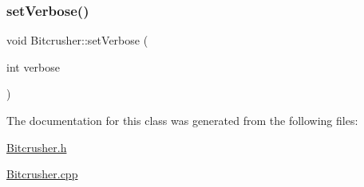 \subsubsection{\texorpdfstring{set\+Verbose()}{setVerbose()}}
{\footnotesize\ttfamily void Bitcrusher\+::set\+Verbose (\begin{DoxyParamCaption}\item[{int}]{verbose }\end{DoxyParamCaption})}



The documentation for this class was generated from the following files\+:\begin{DoxyCompactItemize}
\item 
\mbox{\hyperlink{_bitcrusher_8h}{Bitcrusher.\+h}}\item 
\mbox{\hyperlink{_bitcrusher_8cpp}{Bitcrusher.\+cpp}}\end{DoxyCompactItemize}
